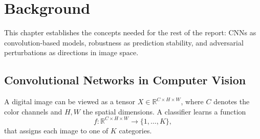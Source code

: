             
            
            
            
            





\chapter{Background}

This chapter establishes the concepts needed for the rest of the report: CNNs as convolution-based models, robustness as prediction stability,
and adversarial perturbations as directions in image space.

\section{Convolutional Networks in Computer Vision}

A digital image can be viewed as a tensor $X \in \mathbb{R}^{C \times H \times W}$, where $C$ denotes the color channels and $H,W$
the spatial dimensions. A classifier learns a function
\[
    f : \mathbb{R}^{C \times H \times W} \longrightarrow \{1,\ldots,K\},
\]
that assigns each image to one of $K$ categories.

